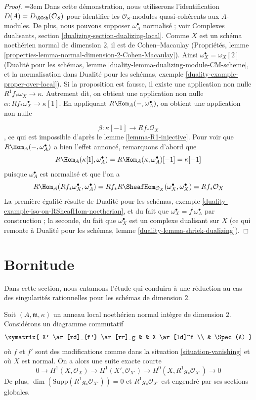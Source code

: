 \begin{proof} \begingroup\emergencystretch=3em
Dans cette démonstration, nous utiliserons l'identification $D(A) = D_\QCoh(\mathcal{O}_S)$ pour identifier les $\mathcal{O}_S$-modules quasi-cohérents aux $A$-modules. De plus, nous pouvons supposer $\omega_A^\bullet$ normalisé ; voir Complexes dualisants, section \ref{dualizing-section-dualizing-local}. Comme $X$ est un schéma noethérien normal de dimension $2$, il est de Cohen--Macaulay (Propriétés, lemme \ref{properties-lemma-normal-dimension-2-Cohen-Macaulay}). Ainsi $\omega_X^\bullet = \omega_X[2]$ (Dualité pour les schémas, lemme \ref{duality-lemma-dualizing-module-CM-scheme}, et la normalisation dans Dualité pour les schémas, exemple \ref{duality-example-proper-over-local}). Si la proposition est fausse, il existe une application non nulle $R^1f_*\omega_X \to \kappa$. Autrement dit, on obtient une application non nulle $\alpha : Rf_*\omega_X^\bullet \to \kappa[1]$. En appliquant $R\Hom_A(-, \omega_A^\bullet)$, on obtient une application non nulle\par\endgroup
$$
\beta : \kappa[-1] \longrightarrow Rf_*\mathcal{O}_X
$$, ce qui est impossible d'après le lemme \ref{lemma-R1-injective}. Pour voir que $R\Hom_A(-, \omega_A^\bullet)$ a bien l'effet annoncé, remarquons d'abord que $$
R\Hom_A(\kappa[1], \omega_A^\bullet) =
R\Hom_A(\kappa, \omega_A^\bullet)[-1] =
\kappa[-1]
$$ puisque $\omega_A^\bullet$ est normalisé et que l'on a $$
R\Hom_A(Rf_*\omega_X^\bullet, \omega_A^\bullet) =
Rf_*R\SheafHom_{\mathcal{O}_X}(\omega_X^\bullet, \omega_X^\bullet) =
Rf_*\mathcal{O}_X
$$ La première égalité résulte de Dualité pour les schémas, exemple \ref{duality-example-iso-on-RSheafHom-noetherian}, et du fait que $\omega_X^\bullet = f^!\omega_A^\bullet$ par construction ; la seconde, du fait que $\omega_X^\bullet$ est un complexe dualisant sur $X$ (ce qui remonte à Dualité pour les schémas, lemme \ref{duality-lemma-shriek-dualizing}). \end{proof}





\section{Bornitude} \label{section-bounded}

\noindent Dans cette section, nous entamons l'étude qui conduira à une réduction au cas des singularités rationnelles pour les schémas de dimension $2$.

\begin{lemma} \label{lemma-exact-sequence} Soit $(A, \mathfrak m, \kappa)$ un anneau local noethérien normal intègre de dimension $2$. Considérons un diagramme commutatif $$
\xymatrix{
X' \ar[rd]_{f'} \ar[rr]_g & & X \ar[ld]^f \\
& \Spec(A)
}
$$ où $f$ et $f'$ sont des modifications comme dans la situation \ref{situation-vanishing} et où $X$ est normal. On a alors une suite exacte courte $$
0 \to H^1(X, \mathcal{O}_X) \to H^1(X', \mathcal{O}_{X'}) \to
H^0(X, R^1g_*\mathcal{O}_{X'}) \to 0
$$ De plus, $\dim(\text{Supp}(R^1g_*\mathcal{O}_{X'})) = 0$ et $R^1g_*\mathcal{O}_{X'}$ est engendré par ses sections globales. \end{lemma}


